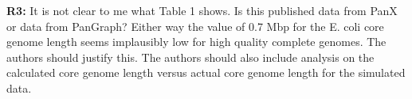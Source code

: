 \documentclass[aps,rmp,onecolumn]{revtex4-1}
\newcommand{\Marco}[1]{{\color{orange}Marco: #1}}
\newcommand{\Liam}[1]{{\color{teal}Liam: #1}}
\newcommand{\reviewer}[2]{\textbf{#1:} #2\vskip 5mm}
\begin{document}
\reviewer{R3}{It is not clear to me what Table 1 shows. Is this published data from PanX or data from PanGraph? Either way the value of 0.7 Mbp for the E. coli core genome length seems implausibly low for high quality complete genomes. The authors should justify this. The authors should also include analysis on the calculated core genome length versus actual core genome length for the simulated data.}
\end{document}
